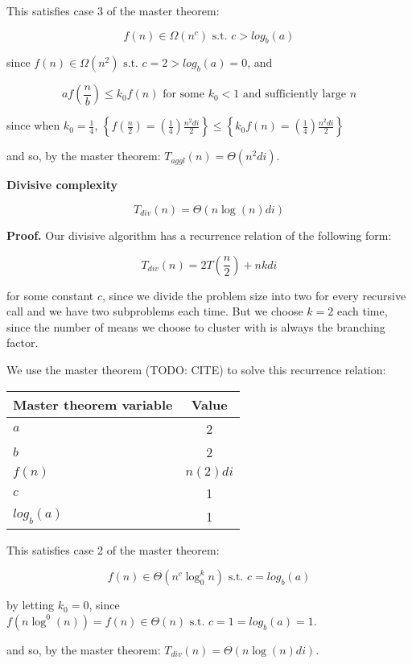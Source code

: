 \documentclass[../tech_report_1.tex]{subfiles}
\begin{document}
This satisfies case 3 of the master theorem:

$$ f(n) \in \Omega(n^c) \text{ s.t. } c > log_b(a) $$

since $f(n) \in \Omega(n^2) \text{ s.t. } c = 2 > log_b(a) = 0$, and

$$ af(\frac{n}{b}) \leq k_0 f(n) \text{ for some } k_0 < 1 \text{ and sufficiently large } n$$

since when  $k_0 = \frac{1}{4}$, $\left\{f(\frac{n}{2}) = (\frac{1}{4}) \frac{n^2di}{2}\right\} \leq \left\{k_0f(n) = (\frac{1}{4}) \frac{n^2di}{2}\right\}$

and so, by the master theorem: $ T_{aggl}(n) = \Theta(n^2di)$. \qedsymbol


\begin{theorem} 

\textbf{Divisive complexity}

$$ T_{div}(n) = \Theta(n\log(n)di) $$

\end{theorem}

\textbf{Proof.} Our divisive algorithm has a recurrence relation of the following form:

$$ T_{div}(n) = 2T(\frac{n}{2}) + nkdi $$

for some constant $c$, since we divide the problem size into two for every recursive call and we have two subproblems each time. But we choose $k=2$ each time, since the number of means we choose to cluster with is always the branching factor.

We use the master theorem (TODO: CITE) to solve this recurrence relation:

\begin{table}[ht]
\centering
\begin{tabular}{l || c }
\hline
\textbf{Master theorem variable} & \textbf{Value} \\
\hline
$a$ & 2 \\
$b$ & 2 \\
$f(n)$ & ${n(2)di}$ \\
$c$ & 1 \\
$log_b(a)$ & 1 \\
\hline
\end{tabular}
\end{table}

This satisfies case 2 of the master theorem:

$$ f(n) \in \Theta(n^c\log^k_0n) \text{ s.t. } c = log_b(a) $$

by letting $k_0=0$, since $f(n\log^0(n)) = f(n) \in \Theta(n) \text{ s.t. } c = 1 = log_b(a) = 1$.

and so, by the master theorem: $ T_{div}(n) = \Theta(n\log(n)di)$. \qedsymbol
\end{document}
